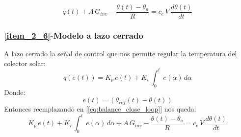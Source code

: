 \begin{equation}
   q(t)+ A\,G_{inv}-\dfrac{\theta(t)-\theta_{a}}{R}=c_e\,V\,\dfrac{d\theta(t)}{dt}\label{eq:balance_close_loop}
\end{equation}

\subsubsection{\ref{item_2_6}-Modelo a lazo cerrado}
A lazo cerrado la señal de control que nos permite regular la temperatura del colector solar:
\begin{equation}
   q(e(t))=K_p\,e(t)+K_i\,\int_0^{t}\,e(\alpha)\,d\alpha
\end{equation}
Donde:
\begin{equation}
   e(t) = (\theta_{ref}(t)-\theta(t))
\end{equation}
Entonces reemplazando en [\ref{eq:balance_close_loop}] nos queda:
\begin{equation}
   K_p\,e(t)+K_i\,\int_0^{t}\,e(\alpha)\,d\alpha + A\,G_{inv}-\dfrac{\theta(t)-\theta_{a}}{R}=c_e\,V\,\dfrac{d\theta(t)}{dt}
   \label{eq:close_loop}
\end{equation}


